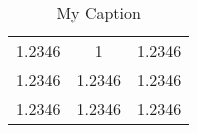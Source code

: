 \begin{table}
    \centering
    \caption{My Caption}
    \label{mylabel}
    \begin{tabular}{ccc}
        \toprule
        1.2346 & 1 & 1.2346 \\
        1.2346 & 1.2346 & 1.2346 \\
        1.2346 & 1.2346 & 1.2346 \\
        \bottomrule
    \end{tabular}
\end{table}

